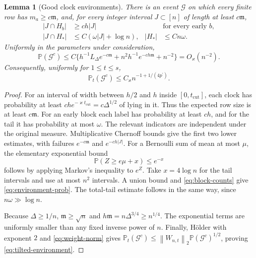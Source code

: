 \documentclass[11pt]{article}
\numberwithin{equation}{section}
\newtheorem{lemma}[theorem]{Lemma}
\theoremstyle{definition}
\theoremstyle{remark}
\newcommand{\Pp}{\mathbb P}
\newcommand{\cG}{\mathcal G}
\newcommand{\pdual}{{p^{\prime}}}
\newcommand{\mres}{\mathfrak m}
\newcommand{\norm}[1]{\left\|#1\right\|}
\begin{document}
\begin{lemma}[Good clock environments]\label{lem:environment}
There is an event $\cG$ on which every finite row has $m_a\ge c\mres$, and, for every integer interval $J\subset[n]$ of length at least $c\mres$,
\begin{align}
 |J\cap H_b|&\ge ch|J| &&\text{for every early }b,\label{eq:early-cell}\\
 |J\cap H_*|&\le C(\omega|J|+\log n),
 & |H_*|&\le Cn\omega .\label{eq:tail-cell}
\end{align}
Uniformly in the parameters under consideration,
\begin{equation}\label{eq:environment-prob}
 \Pp(\cG^c)\le C\{h^{-1}L_\Delta e^{-c\mres}
     +n^2h^{-1}e^{-ch\mres}+n^{-2}\}=O_\varkappa(n^{-2}).
\end{equation}
Consequently, uniformly for $1\le t\le s$,
\begin{equation}\label{eq:tilted-environment}
 \Pp_t(\cG^c)\le C_\varkappa n^{-1+1/(4\pdual)}.
\end{equation}
\end{lemma}
\begin{proof}
For an interval of width between $h/2$ and $h$ inside $[0,t_{\mathrm{cut}}]$, each clock has probability at least $c h e^{-\varkappa t_{\mathrm{cut}}}=c\Delta^{1/2}$ of lying in it. Thus the expected row size is at least $c\mres$. For an early block each label has probability at least $ch$, and for the tail it has probability at most $\omega$. The relevant indicators are independent under the original measure. Multiplicative Chernoff bounds give the first two lower estimates, with failures $e^{-c\mres}$ and $e^{-ch|J|}$. For a Bernoulli sum of mean at most $\mu$, the elementary exponential bound
\[
 \Pp(Z\ge e\mu+x)\le e^{-x}
\]
follows by applying Markov's inequality to $e^Z$. Take $x=4\log n$ for the tail intervals and use at most $n^2$ intervals. A union bound and \eqref{eq:block-counts} give \eqref{eq:environment-prob}. The total-tail estimate follows in the same way, since $n\omega\gg\log n$.

Because $\Delta\ge1/n$, $\mres\ge\sqrt n$ and $h\mres=n\Delta^{3/4}\ge n^{1/4}$. The exponential terms are uniformly smaller than any fixed inverse power of $n$. Finally, H\"older with exponent $2$ and \eqref{eq:weight-norm} gives
$\Pp_t(\cG^c)\le\norm{W_{n,t}}_2\Pp(\cG^c)^{1/2}$, proving \eqref{eq:tilted-environment}.
\end{proof}
\end{document}
